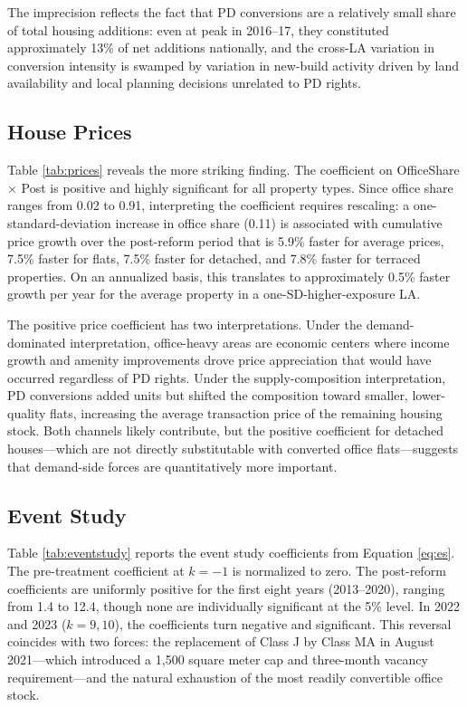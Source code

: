 \documentclass[12pt]{article}
\begin{document}
{\small}

The imprecision reflects the fact that PD conversions are a relatively small share of total housing additions: even at peak in 2016--17, they constituted approximately 13\% of net additions nationally, and the cross-LA variation in conversion intensity is swamped by variation in new-build activity driven by land availability and local planning decisions unrelated to PD rights.

\subsection{House Prices}

Table \ref{tab:prices} reveals the more striking finding. The coefficient on OfficeShare $\times$ Post is positive and highly significant for all property types. Since office share ranges from 0.02 to 0.91, interpreting the coefficient requires rescaling: a one-standard-deviation increase in office share (0.11) is associated with cumulative price growth over the post-reform period that is 5.9\% faster for average prices, 7.5\% faster for flats, 7.5\% faster for detached, and 7.8\% faster for terraced properties. On an annualized basis, this translates to approximately 0.5\% faster growth per year for the average property in a one-SD-higher-exposure LA.

{\small}

The positive price coefficient has two interpretations. Under the demand-dominated interpretation, office-heavy areas are economic centers where income growth and amenity improvements drove price appreciation that would have occurred regardless of PD rights. Under the supply-composition interpretation, PD conversions added units but shifted the composition toward smaller, lower-quality flats, increasing the average transaction price of the remaining housing stock. Both channels likely contribute, but the positive coefficient for detached houses---which are not directly substitutable with converted office flats---suggests that demand-side forces are quantitatively more important.

\subsection{Event Study}

Table \ref{tab:eventstudy} reports the event study coefficients from Equation \ref{eq:es}. The pre-treatment coefficient at $k = -1$ is normalized to zero. The post-reform coefficients are uniformly positive for the first eight years (2013--2020), ranging from 1.4 to 12.4, though none are individually significant at the 5\% level. In 2022 and 2023 ($k = 9, 10$), the coefficients turn negative and significant. This reversal coincides with two forces: the replacement of Class J by Class MA in August 2021---which introduced a 1,500 square meter cap and three-month vacancy requirement---and the natural exhaustion of the most readily convertible office stock.
\end{document}
